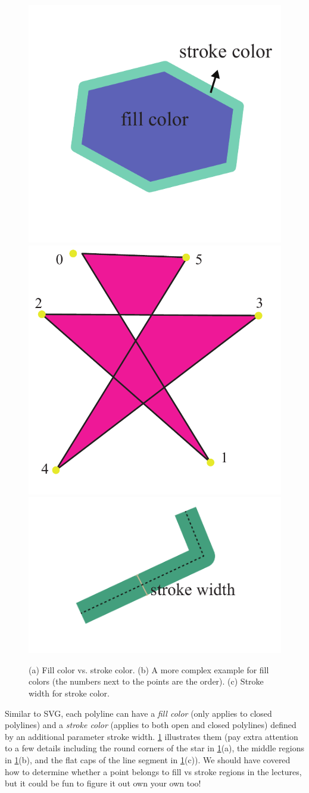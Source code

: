 \begin{figure}[h]
    \centering
    \includegraphics[width=0.3\linewidth]{imgs/fill_vs_stroke.pdf}
    \includegraphics[width=0.3\linewidth]{imgs/fill_rule.pdf}
    \includegraphics[width=0.3\linewidth]{imgs/stroke_width.pdf}
    \caption{(a) Fill color vs. stroke color. (b) A more complex example for fill colors (the numbers next to the points are the order). (c) Stroke width for stroke color.}
    \label{fig:fill_vs_stroke}
\end{figure}

Similar to SVG, each polyline can have a \emph{fill color} (only applies to closed polylines) and a \emph{stroke color} (applies to both open and closed polylines) defined by an additional parameter stroke width. \cref{fig:fill_vs_stroke} illustrates them (pay extra attention to a few details including the round corners of the star in \cref{fig:fill_vs_stroke}(a), the middle regions in \cref{fig:fill_vs_stroke}(b), and the flat caps of the line segment in \cref{fig:fill_vs_stroke}(c)). 
We should have covered how to determine whether a point belongs to fill vs stroke regions in the lectures, but it could be fun to figure it out own your own too!

